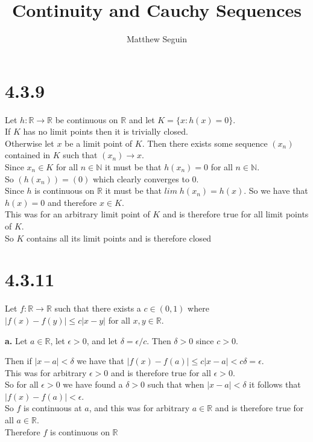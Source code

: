 \documentclass{article}
\title{Continuity and Cauchy Sequences}
\author{Matthew Seguin}
\date{}
\begin{document}
\maketitle


\section*{4.3.9}
\begin{center}
    \doublespacing
    Let $h:\mathbb{R}\rightarrow\mathbb{R}$ be continuous on $\mathbb{R}$ and let $K =\{x : h(x) = 0\}$.
    \\If $K$ has no limit points then it is trivially closed.
    \\Otherwise let $x$ be a limit point of $K$. Then there exists some sequence $(x_n)$ contained in $K$ such that $(x_n)\rightarrow x$.
    \\Since $x_n\in K$ for all $n\in\mathbb{N}$ it must be that $h(x_n) = 0$ for all $n\in\mathbb{N}$.
    \\So $(h(x_n)) = (0)$ which clearly converges to $0$.
    \\Since $h$ is continuous on $\mathbb{R}$ it must be that $lim\;h(x_n) = h(x)$. So we have that $h(x) = 0$ and therefore $x\in K$.
    \\This was for an arbitrary limit point of $K$ and is therefore true for all limit points of $K$.
    \\So $K$ contains all its limit points and is therefore closed \qedsymbol
\end{center}


\newpage
\section*{4.3.11}
\begin{center}
    Let $f:\mathbb{R}\rightarrow\mathbb{R}$ such that there exists a $c\in (0, 1)$ where $|f(x) - f(y)|\leq c|x - y|$ for all $x, y\in\mathbb{R}$.
\end{center}

{\Large\textbf{a.}} Let $a\in\mathbb{R}$, let $\epsilon > 0$, and let $\delta = \epsilon / c$. Then $\delta > 0$ since $c > 0$.
\begin{center}
    \doublespacing
    Then if $|x - a| <\delta$ we have that $|f(x) - f(a)|\leq c|x - a| < c\delta =\epsilon$.
    \\This was for arbitrary $\epsilon > 0$ and is therefore true for all $\epsilon > 0$.
    \\So for all $\epsilon > 0$ we have found a $\delta > 0$ such that when $|x - a| <\delta$ it follows that $|f(x) - f(a)| <\epsilon$.
    \\So $f$ is continuous at $a$, and this was for arbitrary $a\in\mathbb{R}$ and is therefore true for all $a\in\mathbb{R}$.
    \\Therefore $f$ is continuous on $\mathbb{R}$ \qedsymbol
\end{center}
\end{document}
